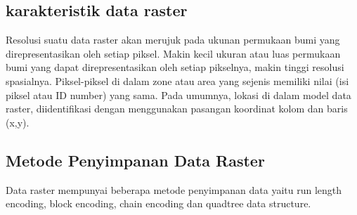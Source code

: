 \subsection{karakteristik data raster}
Resolusi suatu data raster akan merujuk pada ukunan permukaan bumi yang direpresentasikan oleh setiap piksel. 
Makin kecil ukuran atau luas permukaan bumi yang dapat direpresentasikan oleh setiap pikselnya, 
makin tinggi resolusi spasialnya.
Piksel-piksel di dalam zone atau area yang sejenis memiliki nilai (isi piksel atau ID number) yang sama. 
Pada umumnya, lokasi di dalam model data raster, diidentifikasi dengan menggunakan pasangan koordinat kolom dan baris (x,y).

\subsection{Metode Penyimpanan Data Raster}
Data raster mempunyai beberapa metode penyimpanan data yaitu run length encoding, block encoding, chain encoding dan quadtree data structure.

